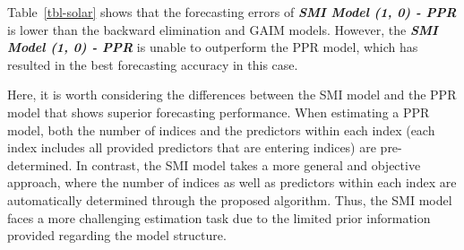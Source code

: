 \documentclass[
  11pt,
  a4paper,
]{article}
\begin{document}
\begin{table}

\caption{\label{tbl-solar}Forecasting daily solar intensity -
Out-of-sample point forecast results: The columns \emph{Model},
\emph{Predictors} and \emph{Indices} indicate the name of the fitted
model, number of predictor variables used/selected (if predictor
selection is performed in the respective model) by the fitted model, and
the number of indices estimated by the fitted model, respectively.}


\end{table}%

Table~\ref{tbl-solar} shows that the forecasting errors of
\textbf{\emph{SMI Model (1, 0) - PPR}} is lower than the backward
elimination and GAIM models. However, the \textbf{\emph{SMI Model (1, 0)
- PPR}} is unable to outperform the PPR model, which has resulted in the
best forecasting accuracy in this case.

Here, it is worth considering the differences between the SMI model and
the PPR model that shows superior forecasting performance. When
estimating a PPR model, both the number of indices and the predictors
within each index (each index includes all provided predictors that are
entering indices) are pre-determined. In contrast, the SMI model takes a
more general and objective approach, where the number of indices as well
as predictors within each index are automatically determined through the
proposed algorithm. Thus, the SMI model faces a more challenging
estimation task due to the limited prior information provided regarding
the model structure.
\end{document}
